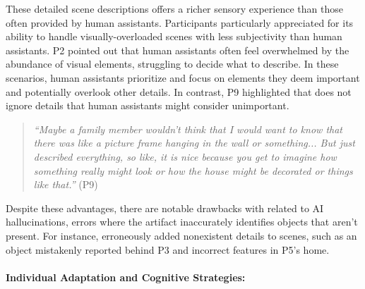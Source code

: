 These detailed scene descriptions offers a richer sensory experience than those often provided by human assistants. Participants particularly appreciated \bma{} for its ability to handle visually-overloaded scenes with less subjectivity than human assistants. P2 pointed out that human assistants often feel overwhelmed by the abundance of visual elements, struggling to decide what to describe. 
% 
In these scenarios, human assistants prioritize and focus on elements they deem important and potentially overlook other details. In contrast, P9 highlighted that \bma{} does not ignore details that human assistants might consider unimportant. 


\begin{quote}
    \textit{``Maybe a family member wouldn't think that I would want to know that there was like a picture frame hanging in the wall or something... But \bma{} just described everything, so like, it is nice because you get to imagine how something really might look or how the house might be decorated or things like that.''} (P9)
\end{quote}


Despite these advantages, there are notable drawbacks with \bma{} related to AI hallucinations, errors where the artifact inaccurately identifies objects that aren't present. 
% 
For instance, \bma{} erroneously added nonexistent details to scenes, such as an object mistakenly reported behind P3 and incorrect features in P5's home. 
% 






\paragraph{Individual Adaptation and Cognitive Strategies:}



